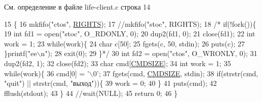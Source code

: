 См. определение в файле life-\/client.\+c строка 14


\begin{DoxyCode}
15 \{
16     mkfifo(\textcolor{stringliteral}{"ctos"}, \hyperlink{life-client_8c_a06fc87d81c62e9abb8790b6e5713c55bafa588afcf6a1d45e5503f8fb1f189df2}{RIGHTS});
17     \textcolor{comment}{//mkfifo("stoc", RIGHTS);}
18    \textcolor{comment}{/* if(!fork())\{}
19 \textcolor{comment}{        int fd1 = open("stoc", O\_RDONLY, 0);}
20 \textcolor{comment}{        dup2(fd1, 0);}
21 \textcolor{comment}{        close(fd1);}
22 \textcolor{comment}{        int work = 1;}
23 \textcolor{comment}{        while(work)\{}
24 \textcolor{comment}{            char c[50];}
25 \textcolor{comment}{            fgets(c, 50, stdin);}
26 \textcolor{comment}{            puts(c);}
27 \textcolor{comment}{        \}printf("ee\(\backslash\)n");}
28 \textcolor{comment}{        exit(0);}
29 \textcolor{comment}{    \}*/}
30     \textcolor{keywordtype}{int} fd2 = open(\textcolor{stringliteral}{"ctos"}, O\_WRONLY, 0);
31     dup2(fd2, 1);
32     close(fd2);
33     \textcolor{keywordtype}{char} cmd[\hyperlink{life-client_8c_a06fc87d81c62e9abb8790b6e5713c55ba82d13d61b41ebfaa72523ab683e418bc}{CMDSIZE}];
34     \textcolor{keywordtype}{int} work = 1;
35     \textcolor{keywordflow}{while}(work)\{
36         cmd[0] = \textcolor{charliteral}{'\(\backslash\)0'};
37         fgets(cmd, \hyperlink{life-client_8c_a06fc87d81c62e9abb8790b6e5713c55ba82d13d61b41ebfaa72523ab683e418bc}{CMDSIZE}, stdin);
38         \textcolor{keywordflow}{if}(strstr(cmd, \textcolor{stringliteral}{"quit"}) || strstr(cmd, \textcolor{stringliteral}{"выход"}))\{
39             work = 0;
40         \}
41         puts(cmd);
42         fflush(stdout);
43     \}
44     \textcolor{comment}{//wait(NULL);}
45     \textcolor{keywordflow}{return} 0;
46 \}
\end{DoxyCode}

